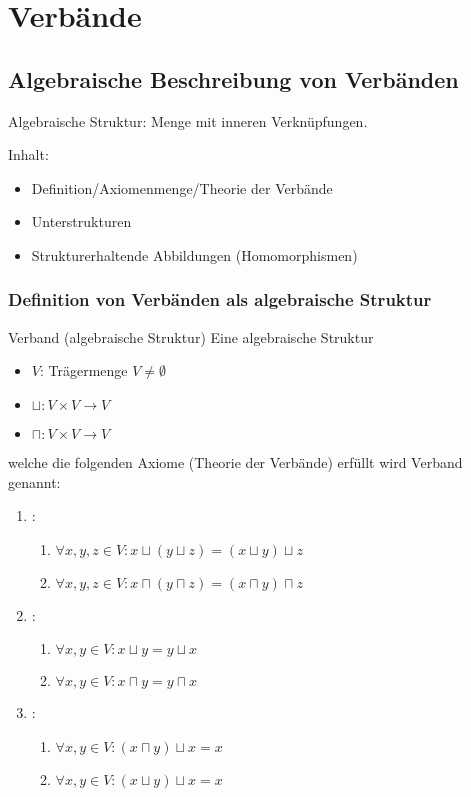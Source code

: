\documentclass{paper}
\begin{document}
\section{Verbände}

\subsection{Algebraische Beschreibung von Verbänden}

Algebraische Struktur: Menge mit inneren Verknüpfungen.

Inhalt:
\begin{itemize}
\item Definition/Axiomenmenge/Theorie der Verbände
\item Unterstrukturen
\item Strukturerhaltende Abbildungen (Homomorphismen)
\end{itemize}


\subsubsection{Definition von Verbänden als algebraische Struktur}

\begin{definition}{Verband (algebraische Struktur)}
Eine algebraische Struktur %
\begin{itemize}
\item $V$: Trägermenge $V ≠ ∅$
\item $⊔: V × V → V$
\item $⊓: V × V → V$
\end{itemize}
welche die folgenden Axiome (Theorie der Verbände) erfüllt wird Verband genannt:
\begin{enumerate}
\item {}: 
    \begin{enumerate}
    \item $∀ x, y, z ∈ V: x ⊔ (y ⊔ z) = (x ⊔ y) ⊔ z$
    \item $∀ x, y, z ∈ V: x ⊓ (y ⊓ z) = (x ⊓ y) ⊓ z$
    \end{enumerate}
\item {}:
    \begin{enumerate}
    \item $∀ x, y ∈ V: x ⊔ y = y ⊔ x$
    \item $∀ x, y ∈ V: x ⊓ y = y ⊓ x$
    \end{enumerate}
\item {}:
    \begin{enumerate}
    \item $∀ x, y ∈ V: (x ⊓ y) ⊔ x = x$ 
    \item $∀ x, y ∈ V: (x ⊔ y) ⊔ x = x$ 
    \end{enumerate}
\end{enumerate}
\end{definition}
\end{document}
